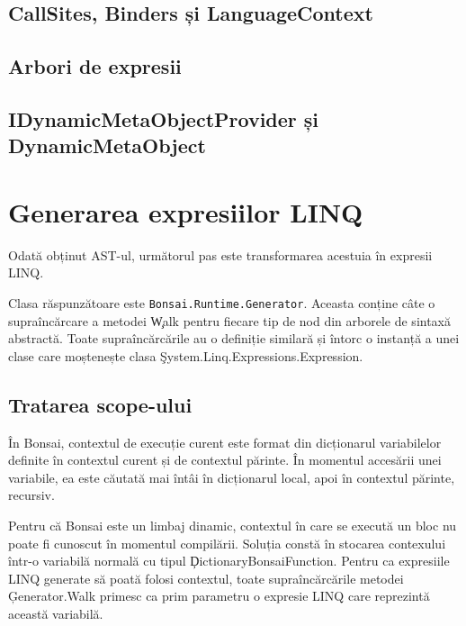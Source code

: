 \documentclass[12pt,a4paper]{memoir}
\begin{document}

\subsection{CallSites, Binders și LanguageContext}


\subsection{Arbori de expresii}


\subsection{IDynamicMetaObjectProvider și DynamicMetaObject}


\section{Generarea expresiilor LINQ}

Odată obținut AST-ul, următorul pas este transformarea acestuia în expresii LINQ\cite{linq_expressions}. 

Clasa răspunzătoare este \texttt{Bonsai.Runtime.Generator}. Aceasta conține câte o supraîncărcare a metodei \c{Walk} pentru fiecare tip de nod din arborele de sintaxă abstractă. Toate supraîncărcările au o definiție similară și întorc o instanță a unei clase care moștenește clasa \c{System.Linq.Expressions.Expression}.

\subsection{Tratarea scope-ului} 

În Bonsai, contextul de execuție curent este format din dicționarul variabilelor definite în contextul curent și de contextul părinte. În momentul accesării unei variabile, ea este căutată mai întâi în dicționarul local, apoi în contextul părinte, recursiv.

Pentru că Bonsai este un limbaj dinamic, contextul în care se execută un bloc nu poate fi cunoscut în momentul compilării. Soluția constă în stocarea contexului într-o variabilă normală cu tipul \c{DictionaryBonsaiFunction}. Pentru ca expresiile LINQ generate să poată folosi contextul, toate supraîncărcările metodei \c{Generator.Walk} primesc ca prim parametru o expresie LINQ care reprezintă această variabilă.
\end{document}
